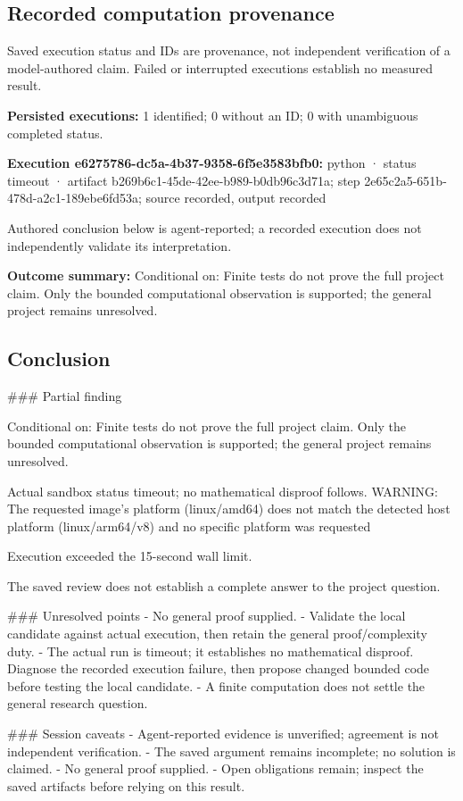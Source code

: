 \documentclass[11pt]{article}
\begin{document}
\subsection{Recorded computation provenance}
Saved execution status and IDs are provenance, not independent verification of a model-authored claim. Failed or interrupted executions establish no measured result.\par
\textbf{Persisted executions:} 1 identified; 0 without an ID; 0 with unambiguous completed status.\par
\textbf{Execution e6275786-dc5a-4b37-9358-6f5e3583bfb0:} python · status timeout · artifact b269b6c1-45de-42ee-b989-b0db96c3d71a; step 2e65c2a5-651b-478d-a2c1-189ebe6fd53a; source recorded, output recorded\par
Authored conclusion below is agent-reported; a recorded execution does not independently validate its interpretation.\par
\textbf{Outcome summary:} Conditional on: Finite tests do not prove the full project claim. Only the bounded computational observation is supported; the general project remains unresolved.\par
\subsection{Conclusion}
\#\#\# Partial finding

Conditional on: Finite tests do not prove the full project claim. Only the bounded computational observation is supported; the general project remains unresolved.

Actual sandbox status timeout; no mathematical disproof follows. WARNING: The requested image's platform (linux/amd64) does not match the detected host platform (linux/arm64/v8) and no specific platform was requested

Execution exceeded the 15-second wall limit.

The saved review does not establish a complete answer to the project question.

\#\#\# Unresolved points
- No general proof supplied.
- Validate the local candidate against actual execution, then retain the general proof/complexity duty.
- The actual run is timeout; it establishes no mathematical disproof. Diagnose the recorded execution failure, then propose changed bounded code before testing the local candidate.
- A finite computation does not settle the general research question.

\#\#\# Session caveats
- Agent-reported evidence is unverified; agreement is not independent verification.
- The saved argument remains incomplete; no solution is claimed.
- No general proof supplied.
- Open obligations remain; inspect the saved artifacts before relying on this result.
\end{document}
